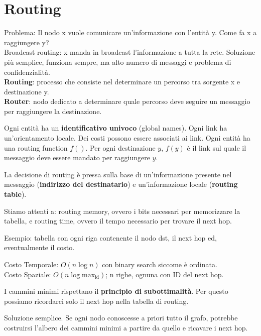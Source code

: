 \section{Routing}
Problema: Il nodo x vuole comunicare un'informazione con l'entità y. Come fa x a raggiungere y?\\
Broadcast routing: x manda in broadcast l'informazione a tutta la rete. Soluzione più semplice, funziona sempre, ma alto numero di
messaggi e problema di confidenzialità.\\
\textbf{Routing}: processo che consiste nel determinare un percorso tra sorgente x e destinazione y.\\
\textbf{Router}: nodo dedicato a determinare quale percorso deve seguire un messaggio per raggiungere la destinazione.

Ogni entità ha un \textbf{identificativo univoco} (global names).
Ogni link ha un'orientamento locale. Dei costi possono essere associati ai link.
Ogni entità ha una routing function $f()$. Per ogni destinazione $y$, $f(y)$ è il link sul quale il messaggio deve essere mandato per raggiungere $y$.

La decisione di routing è pressa sulla base di un'informazione presente nel messaggio (\textbf{indirizzo del destinatario}) e un'informazione locale (\textbf{routing table}).

Stiamo attenti a: routing memory, ovvero i bits necessari per memorizzare la tabella, e routing time, ovvero il tempo necessario per trovare il next hop.

Esempio: tabella con ogni riga contenente il nodo dst, il next hop ed, eventualmente il costo.

Costo Temporale: $O(n \log n)$ con binary search siccome è ordinata.\\
Costo Spaziale: $O(n \log \text{max}_\text{id})$; n righe, ognuna con ID del next hop.

I cammini minimi rispettano il \textbf{principio di subottimalità}. Per questo possiamo ricordarci solo il next hop nella tabella di routing.

Soluzione semplice. Se ogni nodo conoscesse a priori tutto il grafo, potrebbe costruirsi l'albero dei cammini minimi a partire da quello e ricavare i next hop.

